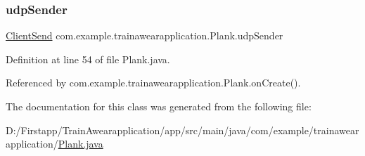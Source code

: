 \mbox{\label{classcom_1_1example_1_1trainawearapplication_1_1_plank_a840985b7a4ec5f3092c91a8336e616e9}} 
\subsubsection{\texorpdfstring{udpSender}{udpSender}}
{\footnotesize\ttfamily \mbox{\hyperlink{classcom_1_1example_1_1trainawearapplication_1_1_client_send}{Client\+Send}} com.\+example.\+trainawearapplication.\+Plank.\+udp\+Sender\hspace{0.3cm}{\ttfamily [private]}}



Definition at line 54 of file Plank.\+java.



Referenced by com.\+example.\+trainawearapplication.\+Plank.\+on\+Create().



The documentation for this class was generated from the following file\+:\begin{DoxyCompactItemize}
\item 
D\+:/\+Firstapp/\+Train\+Awearapplication/app/src/main/java/com/example/trainawearapplication/\mbox{\hyperlink{_plank_8java}{Plank.\+java}}\end{DoxyCompactItemize}
